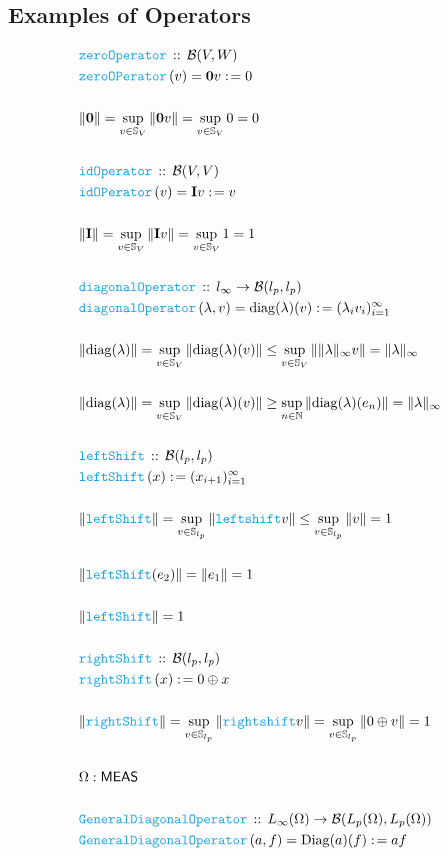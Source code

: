 \documentclass[12pt]{scrartcl}
\newcommand{\FUNC}[1]{\textcolor{Cerulean}{\mathtt{#1}}}
\renewcommand{\.}{\; . \;}
\newcommand{\de}{: \kern 0.1pc =}
\newcommand{\Act}[1]{\left( #1 \right)}
\newcommand{\DeclareFunc}[2]{& \FUNC{#1} \, :: \, #2 \\}
\newcommand{\DefineFunc}[3]{&  \FUNC{#1}\Act{#2} \de #3 \\}
\newcommand{\DefineNamedFunc}[4]{&  \FUNC{#1}\Act{#2} = #3 \de #4 \\}
\newcommand{\Page}[1]{\begin{align*} #1 \end{align*} \newpage   }
\newcommand{\Nat}{\mathbb{N} }
\newcommand{\Sphere}{\mathbb{S}}
\newcommand{\MEAS}{\mathsf{MEAS}}
\renewcommand{\O}{\Omega}
\newcommand{\B}{\mathcal{B}}
\begin{document}
 \subsection{Examples of Operators}
 \Page{ \DeclareFunc{zeroOperator}{\B(V,W)}
   \DefineNamedFunc{zeroOPerator}{v}{\mathbf{0}v}{0}  
    \\
   & \| \mathbf{0} \| = \sup_{v \in \mathbb{S}_V} \| \mathbf{0}v \| 
   = \sup_{v \in \Sphere_V} 0 = 0 \\
   \\
    \DeclareFunc{idOperator}{\B(V,V)}
   \DefineNamedFunc{idOPerator}{v}{\mathbf{I}v}{v}  
   \\
   &  \| \mathbf{I}  \| = \sup_{v \in \Sphere_V } \|\mathbf{I} v \| 
   =    \sup_{v \in \Sphere_V } 1 = 1 \\
   \\ 
   \DeclareFunc{diagonalOperator}{l_{\infty} \to \B(l_p,l_p)}
   \DefineNamedFunc{diagonalOperator}{\lambda,v}{ \mathrm{diag}(\lambda)(v) }{ 
   (\lambda_i v_i )^\infty_{i = 1} }
   \\
  & \| \mathrm{diag}(\lambda)  \| = \sup_{v \in \Sphere_V } 
   \| \mathrm{diag}(\lambda)(v) \| \le  \sup_{v \in \Sphere_V } 
   \| \| \lambda \|_{\infty} v \| = \| \lambda \|_{\infty}
   \\ \\
  & \| \mathrm{diag}(\lambda) \| = \sup_{v \in \Sphere_V } 
   \| \mathrm{diag}(\lambda)(v) \| 
   \ge
   \sup_{n \in \Nat } 
   \| \mathrm{diag}(\lambda)(e_n) \| = \| \lambda \|_{\infty}
   \\ \\
   \DeclareFunc{leftShift}{\B(l_p,l_p)}
   \DefineFunc{leftShift}{x}{ (x_{i+1} )_{i = 1}^\infty }
   \\ 
     &  \| \FUNC{leftShift}  \| =  
     \sup_{v \in \Sphere_{l_p} } \|\FUNC{leftshift} v \| \le 
      \sup_{v \in \Sphere_{l_p} } \| v \| = 1 \\
   \\
    & \| \FUNC{leftShift}(e_2) \| = \| e_1 \| = 1 
   \\ \\
   &  \| \FUNC{leftShift}  \| = 1 
   \\ \\                        
   \DeclareFunc{rightShift}{\B(l_p,l_p)}
   \DefineFunc{rightShift}{x}{ 0 \oplus x }
   \\ 
   &  \| \FUNC{rightShift}  \| =  
     \sup_{v \in \Sphere_{l_p} } \|\FUNC{rightshift} v \| = 
      \sup_{v \in \Sphere_{l_p} } \|  0 \oplus v \| = 1 \\   
   \\
   & \O : \MEAS
   \\ \\
    \DeclareFunc{GeneralDiagonalOperator}{ L_\infty(\O) \to  \B(L_p(\O),L_p(\O)) }
  \DefineNamedFunc{GeneralDiagonalOperator}{ a, f }{ \mathrm{Diag}(a)(f)}{af}
 } 
\end{document}
